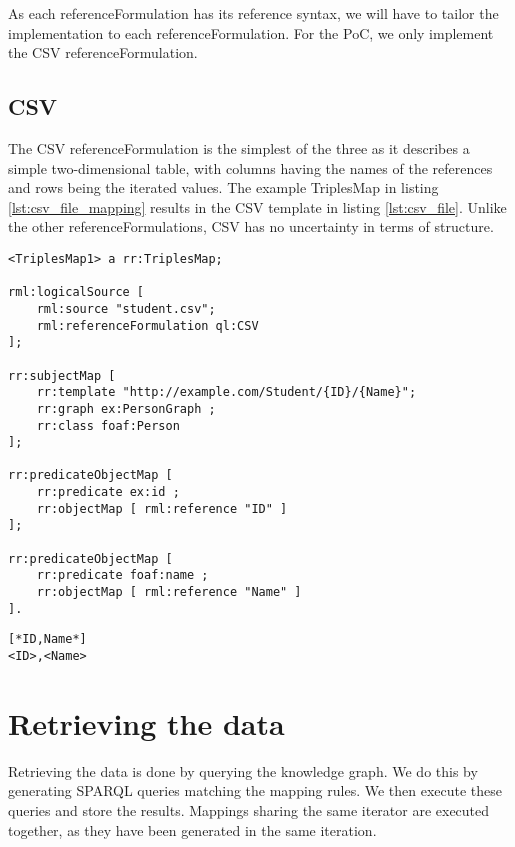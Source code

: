As each referenceFormulation has its reference syntax, we will have to tailor the implementation to each referenceFormulation. For the PoC, we only implement the CSV referenceFormulation. 

\subsection{CSV}
\label{subsection:csv}
The CSV referenceFormulation is the simplest of the three as it describes a simple two-dimensional table, with columns having the names of the references and rows being the iterated values. The example TriplesMap in listing \ref{lst:csv_file_mapping} results in the CSV template in listing \ref{lst:csv_file}. Unlike the other referenceFormulations, CSV has no uncertainty in terms of structure.

\begin{lstlisting}[caption={Example mapping for a CSV file}, label={lst:csv_file_mapping}, captionpos=b, basicstyle=\small]
<TriplesMap1> a rr:TriplesMap;

rml:logicalSource [ 
    rml:source "student.csv";
    rml:referenceFormulation ql:CSV
];

rr:subjectMap [ 
    rr:template "http://example.com/Student/{ID}/{Name}";
    rr:graph ex:PersonGraph ;
    rr:class foaf:Person
];

rr:predicateObjectMap [ 
    rr:predicate ex:id ; 
    rr:objectMap [ rml:reference "ID" ]
];

rr:predicateObjectMap [ 
    rr:predicate foaf:name ; 
    rr:objectMap [ rml:reference "Name" ]
].
\end{lstlisting}

\begin{lstlisting}[caption={Example CSV template}, label={lst:csv_file}, captionpos=b, basicstyle=\small]
[*ID,Name*]
<ID>,<Name>
\end{lstlisting}

\section{Retrieving the data}
\label{section:retrieving_data}
Retrieving the data is done by querying the knowledge graph. We do this by generating SPARQL queries matching the mapping rules. We then execute these queries and store the results. Mappings sharing the same iterator are executed together, as they have been generated in the same iteration. 

